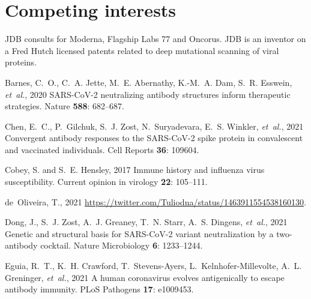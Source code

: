 \documentclass[9pt,twocolumn,twoside]{gsajnl_modified}
\begin{document}
{\section{Competing interests}
JDB consults for Moderna, Flagship Labs 77 and Oncorus.
JDB is an inventor on a Fred Hutch licensed patents related to deep mutational scanning of viral proteins.

\begin{thebibliography}{30}

{Barnes, C.~O., C.~A. Jette, M.~E. Abernathy, K.-M.~A. Dam, S.~R. Esswein, {\em
  et~al.\/}}, 2020 {SARS-CoV-2} neutralizing antibody structures inform
  therapeutic strategies. Nature {\bf 588}: 682--687.

{Chen, E.~C., P.~Gilchuk, S.~J. Zost, N.~Suryadevara, E.~S. Winkler, {\em
  et~al.\/}}, 2021 Convergent antibody responses to the {SARS-CoV-2} spike
  protein in convalescent and vaccinated individuals. Cell Reports {\bf 36}:
  109604.

{Cobey, S. {\rm and} S.~E. Hensley}, 2017 Immune history and influenza virus
  susceptibility. Current opinion in virology {\bf 22}: 105--111.

{de~Oliveira, T.}, 2021
  \url{https://twitter.com/Tuliodna/status/1463911554538160130}.

{Dong, J., S.~J. Zost, A.~J. Greaney, T.~N. Starr, A.~S. Dingens, {\em
  et~al.\/}}, 2021 Genetic and structural basis for {SARS-CoV-2} variant
  neutralization by a two-antibody cocktail. Nature Microbiology {\bf 6}:
  1233--1244.

{Eguia, R.~T., K.~H. Crawford, T.~Stevens-Ayers, L.~Kelnhofer-Millevolte, A.~L.
  Greninger, {\em et~al.\/}}, 2021 A human coronavirus evolves antigenically to
  escape antibody immunity. PLoS Pathogens {\bf 17}: e1009453.


\end{thebibliography}}
\end{document}
